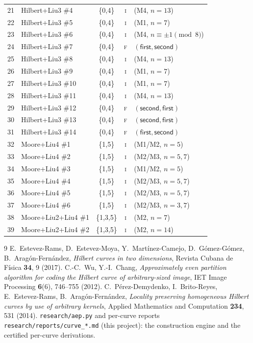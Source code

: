 \documentclass[11pt]{article}
\theoremstyle{definition}
\begin{document}
{\begin{longtable}{clccl}
21 & Hilbert+Liu3 \#4 & \{0,4\} & \textsc{i} & (M4, $n{=}13$)\\
22 & Hilbert+Liu3 \#5 & \{0,4\} & \textsc{i} & (M1, $n{=}7$)\\
23 & Hilbert+Liu3 \#6 & \{0,4\} & \textsc{i} & (M4, $n\equiv\pm1\!\!\pmod 8$)\\
24 & Hilbert+Liu3 \#7 & \{0,4\} & \textsc{f} & $(\textsf{first},\textsf{second})$\\
25 & Hilbert+Liu3 \#8 & \{0,4\} & \textsc{i} & (M4, $n{=}13$)\\
26 & Hilbert+Liu3 \#9 & \{0,4\} & \textsc{i} & (M1, $n{=}7$)\\
27 & Hilbert+Liu3 \#10 & \{0,4\} & \textsc{i} & (M1, $n{=}7$)\\
28 & Hilbert+Liu3 \#11 & \{0,4\} & \textsc{i} & (M4, $n{=}13$)\\
29 & Hilbert+Liu3 \#12 & \{0,4\} & \textsc{f} & $(\textsf{second},\textsf{first})$\\
30 & Hilbert+Liu3 \#13 & \{0,4\} & \textsc{f} & $(\textsf{second},\textsf{first})$\\
31 & Hilbert+Liu3 \#14 & \{0,4\} & \textsc{f} & $(\textsf{first},\textsf{second})$\\
32 & Moore+Liu4 \#1 & \{1,5\} & \textsc{i} & (M1/M2, $n{=}5$)\\
33 & Moore+Liu4 \#2 & \{1,5\} & \textsc{i} & (M2/M3, $n{=}5,7$)\\
34 & Moore+Liu4 \#3 & \{1,5\} & \textsc{i} & (M1/M2, $n{=}5$)\\
35 & Moore+Liu4 \#4 & \{1,5\} & \textsc{i} & (M2/M3, $n{=}5,7$)\\
36 & Moore+Liu4 \#5 & \{1,5\} & \textsc{i} & (M2/M3, $n{=}5,7$)\\
37 & Moore+Liu4 \#6 & \{1,5\} & \textsc{i} & (M2/M3, $n{=}3,7$)\\
38 & Moore+Liu2+Liu4 \#1 & \{1,3,5\} & \textsc{i} & (M2, $n{=}7$)\\
39 & Moore+Liu2+Liu4 \#2 & \{1,3,5\} & \textsc{i} & (M2, $n{=}14$)\\
\bottomrule
\end{longtable}}

\begin{thebibliography}{9}
 E.~Estevez-Rams, D.~Estevez-Moya, Y.~Mart\'inez-Camejo, D.~G\'omez-G\'omez, B.~Arag\'on-Fern\'andez,
\emph{Hilbert curves in two dimensions}, Revista Cubana de F\'isica \textbf{34}, 9 (2017).
 C.-C.~Wu, Y.-I.~Chang, \emph{Approximately even partition algorithm
for coding the Hilbert curve of arbitrary-sized image}, IET Image Processing \textbf{6}(6),
746--755 (2012).
 C.~P\'erez-Demydenko, I.~Brito-Reyes, E.~Estevez-Rams, B.~Arag\'on-Fern\'andez,
\emph{Locality preserving homogeneous Hilbert curves by use of arbitrary kernels}, Applied
Mathematics and Computation \textbf{234}, 531 (2014).
 \texttt{research/aep.py} and per-curve reports \texttt{research/reports/curve\_*.md}
(this project): the construction engine and the certified per-curve derivations.
\end{thebibliography}
\end{document}
